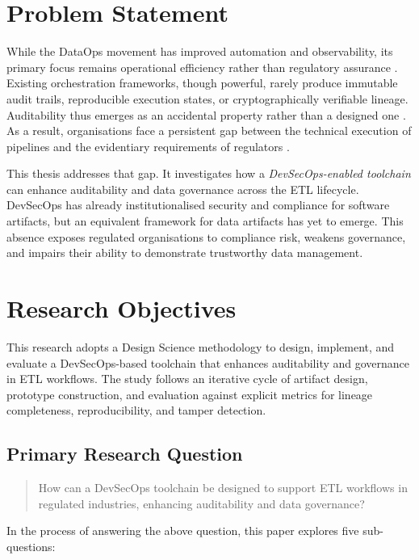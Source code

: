 \section{Problem Statement}
\noindent
While the DataOps movement has improved automation and observability, its
primary focus remains operational efficiency rather than regulatory assurance
\cite{munappy_ad-hoc_2020, mahmud_role_2022}. Existing orchestration frameworks,
though powerful, rarely produce immutable audit trails, reproducible execution
states, or cryptographically verifiable lineage. Auditability thus emerges as an
accidental property rather than a designed one
\cite{wang_enabling_2011, weigand_auditability_2019}. As a result,
organisations face a persistent gap between the technical execution of
pipelines and the evidentiary requirements of regulators
\cite{cps234, cps230}.

This thesis addresses that gap. It investigates how a \emph{DevSecOps-enabled
toolchain} can enhance auditability and data governance across the ETL
lifecycle. DevSecOps has already institutionalised security and compliance for
software artifacts, but an equivalent framework for data artifacts has yet to
emerge. This absence exposes regulated organisations to compliance risk,
weakens governance, and impairs their ability to demonstrate trustworthy data
management.

\section{Research Objectives}
\noindent
This research adopts a Design Science methodology
\cite{hevner_design_2004} to design, implement, and evaluate a DevSecOps-based
toolchain that enhances auditability and governance in ETL workflows. The study
follows an iterative cycle of artifact design, prototype construction, and
evaluation against explicit metrics for lineage completeness, reproducibility,
and tamper detection.

\subsection*{Primary Research Question}
\begin{quote}
How can a DevSecOps toolchain be designed to support ETL workflows in regulated
industries, enhancing auditability and data governance?
\end{quote}

In the process of answering the above question, this paper explores five
sub-questions:


